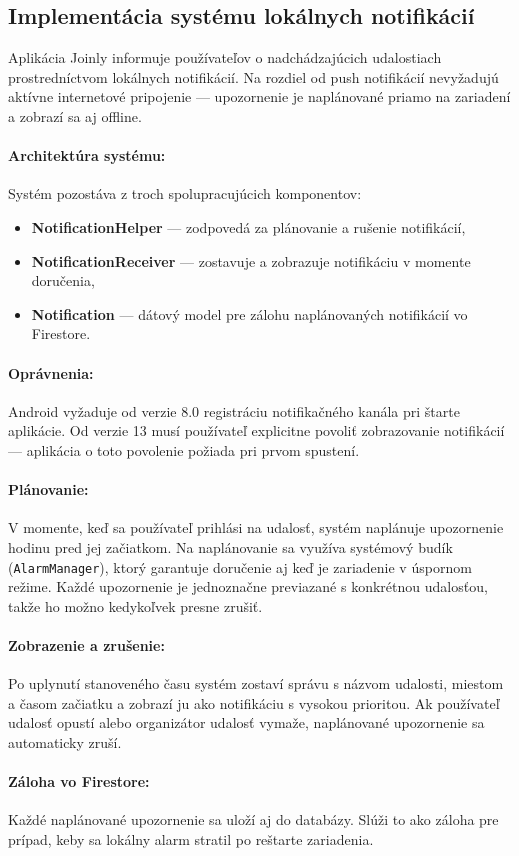  \subsection{Implementácia systému lokálnych notifikácií}

  Aplikácia Joinly informuje používateľov o nadchádzajúcich udalostiach
  prostredníctvom lokálnych notifikácií. Na rozdiel od push notifikácií
  nevyžadujú aktívne internetové pripojenie — upozornenie je naplánované
  priamo na zariadení a zobrazí sa aj offline.

  \paragraph{Architektúra systému:}
  Systém pozostáva z troch spolupracujúcich komponentov:
  \begin{itemize}[noitemsep, nolistsep]
      \item \textbf{NotificationHelper} — zodpovedá za plánovanie a rušenie notifikácií,
      \item \textbf{NotificationReceiver} — zostavuje a zobrazuje notifikáciu v momente doručenia,
      \item \textbf{Notification} — dátový model pre zálohu naplánovaných notifikácií vo Firestore.
  \end{itemize}

  \paragraph{Oprávnenia:}
  Android vyžaduje od verzie 8.0 registráciu notifikačného kanála pri
  štarte aplikácie. Od verzie 13 musí používateľ explicitne povoliť
  zobrazovanie notifikácií — aplikácia o toto povolenie požiada pri
  prvom spustení.

  \paragraph{Plánovanie:}
  V momente, keď sa používateľ prihlási na udalosť, systém naplánuje
  upozornenie hodinu pred jej začiatkom. Na naplánovanie sa využíva
  systémový budík (\texttt{AlarmManager}), ktorý garantuje doručenie
  aj keď je zariadenie v úspornom režime. Každé upozornenie je
  jednoznačne previazané s konkrétnou udalosťou, takže ho možno
  kedykoľvek presne zrušiť.

  \paragraph{Zobrazenie a zrušenie:}
  Po uplynutí stanoveného času systém zostaví správu s názvom udalosti,
  miestom a časom začiatku a zobrazí ju ako notifikáciu s vysokou
  prioritou. Ak používateľ udalosť opustí alebo organizátor udalosť
  vymaže, naplánované upozornenie sa automaticky zruší.

  \paragraph{Záloha vo Firestore:}
  Každé naplánované upozornenie sa uloží aj do databázy. Slúži to ako
  záloha pre prípad, keby sa lokálny alarm stratil po reštarte zariadenia.